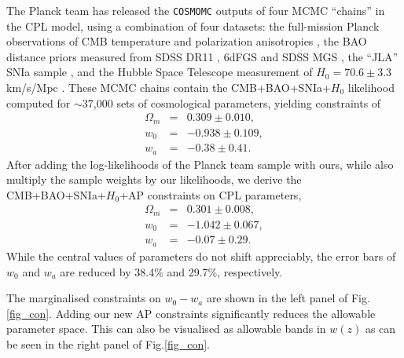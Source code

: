 \documentclass[prl,twocolumn,superscriptaddress,aps,amsmath,amssymb,nofootinbib,altaffilletter]{revtex4}
\begin{document}
The Planck team has released the {\texttt {COSMOMC}} \citep{LB2002} outputs of four MCMC ``chains'' in the CPL model, 
using a combination of four datasets:
the full-mission Planck observations of CMB temperature and polarization anisotropies \cite{Planck2015},
the BAO distance priors measured from SDSS DR11 \citep{Anderson2013}, 6dFGS \citep{6dFGS} and SDSS MGS \citep{MGS},
the ``JLA'' SNIa sample \citep{JLA},
and the Hubble Space Telescope measurement of $H_0=70.6\pm3.3$ km/s/Mpc \cite{Riess2011,E14H0}.
These MCMC chains contain the CMB+BAO+SNIa+$H_0$ likelihood computed for $\sim$37,000 sets of cosmological parameters,
yielding constraints of %
\begin{eqnarray}
 \Omega_m &=& 0.309 \pm 0.010,  \\ \nonumber
 w_0 &=& -0.938 \pm 0.109,  \\ \nonumber
 w_a &=& -0.38 \pm 0.41.
\end{eqnarray}
After adding the log-likelihoods of the Planck team sample with ours, 
while also multiply the sample weights by our likelihoods, 
we derive the CMB+BAO+SNIa+$H_0$+AP constraints on CPL parameters, %
\begin{eqnarray}
\Omega_m &=& 0.301 \pm 0.008, \\ \nonumber
w_0 &=& -1.042 \pm 0.067, \\ \nonumber
w_a &=& -0.07 \pm 0.29.
\end{eqnarray}
While the central values of parameters do not shift appreciably,
the error bars of $w_0$ and $w_a$ are reduced by 38.4\% and 29.7\%, respectively.%

The marginalised constraints on $w_0-w_a$ are shown in the left panel of Fig.\ref{fig_con}.
Adding our new AP constraints significantly reduces the allowable parameter space. 
This can also be visualised as allowable bands in $w(z)$ as can be seen in the right panel of Fig.\ref{fig_con}.  
\end{document}
